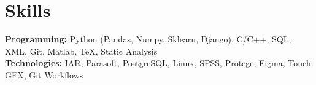 \documentclass{../templates/simplecv}
\begin{document}
\section{Skills}
\vspace{3pt}
\resumeSubHeadingListStart
\small{\item{
    \textbf{Programming: }{Python (Pandas, Numpy, Sklearn, Django), C/C++, SQL, XML, Git, Matlab, TeX, Static Analysis} \\ \vspace{3pt}
    \textbf{Technologies: }{IAR, Parasoft, PostgreSQL, Linux, SPSS, Protege, Figma, Touch GFX, Git Workflows}
}}
\resumeSubHeadingListEnd
\end{document}
